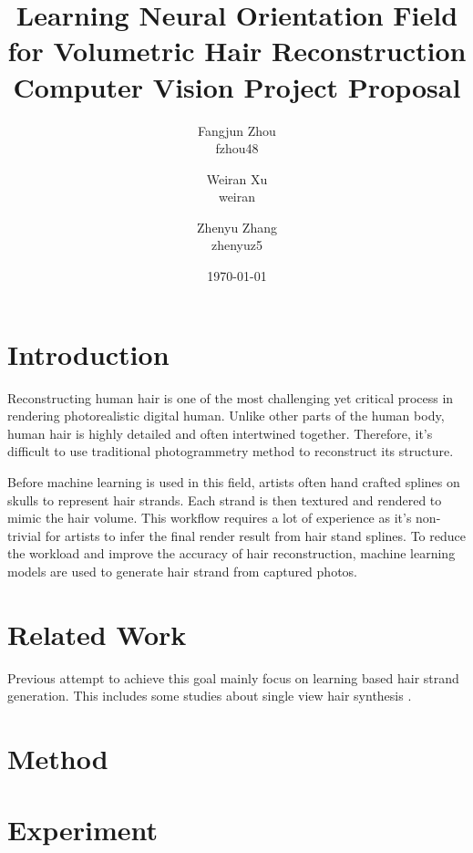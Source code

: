 \documentclass[12pt]{article}
\title{
  Learning Neural Orientation Field for Volumetric Hair Reconstruction \\
  {
    \small
    Computer Vision Project Proposal
  }
}
\author{
  Fangjun Zhou \\ fzhou48
  \and Weiran Xu \\ weiran
  \and Zhenyu Zhang \\ zhenyuz5
}
\date{\today}
\begin{document}
  \maketitle

  \section{Introduction}

  Reconstructing human hair is one of the most challenging yet critical process in rendering photorealistic digital human. Unlike other parts of the human body, human hair is highly detailed and often intertwined together. Therefore, it's difficult to use traditional photogrammetry method to reconstruct its structure.

  Before machine learning is used in this field, artists often hand crafted splines on skulls to represent hair strands. Each strand is then textured and rendered to mimic the hair volume. This workflow requires a lot of experience as it's non-trivial for artists to infer the final render result from hair stand splines. To reduce the workload and improve the accuracy of hair reconstruction, machine learning models are used to generate hair strand from captured photos.

  \section{Related Work}

  Previous attempt to achieve this goal mainly focus on learning based hair strand generation. This includes some studies about single view hair synthesis \cite{saito_3d_2018, zheng_hairstep_2023, wu_neuralhdhair_2022, ma_single-view_nodate}.

  \section{Method}

  \section{Experiment}
  

  \printbibliography
\end{document}
